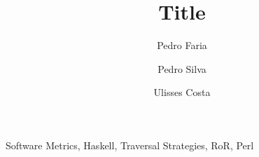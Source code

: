 \documentclass[citeauthoryear]{llncs}
\title{Title}
\author{Pedro Faria \and Pedro Silva \and  Ulisses Costa}
\institute{Department of Informatics, University of Minho}
\begin{document}
\maketitle



\keywords Software Metrics, Haskell, Traversal Strategies, RoR, Perl








\end{document}
